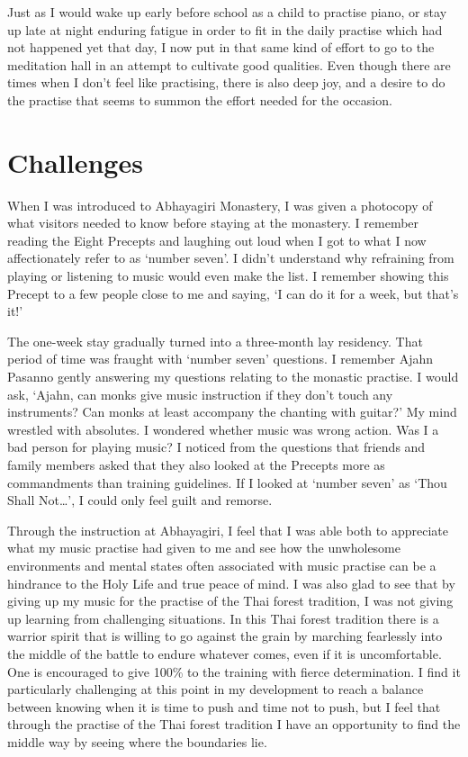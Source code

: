 Just as I would wake up early before school as a
child to practise piano, or stay up late at night enduring fatigue in
order to fit in the daily practise which had not happened yet that day, 
I now put in that same kind of effort to go to the meditation hall in an
attempt to cultivate good qualities. Even though there are times when I
don't feel like practising, there is also deep joy, and a desire to do
the practise that seems to summon the effort needed for the occasion. 

\section{Challenges}

When I was introduced to Abhayagiri Monastery, I was given a photocopy
of what visitors needed to know before staying at the monastery. I
remember reading the Eight Precepts and laughing out loud when I got to
what I now affectionately refer to as `number seven'. I didn't
understand why refraining from playing or listening to music would even
make the list. I remember showing this Precept to a few people close to
me and saying, `I can do it for a week, but that's it!'

The one-week stay gradually turned into a three-month lay residency. 
That period of time was fraught with `number seven' questions. I
remember Ajahn Pasanno gently answering my questions relating to the
monastic practise. I would ask, `Ajahn, can monks give music instruction
if they don't touch any instruments? Can monks at least accompany the
chanting with guitar?' My mind wrestled with absolutes. I wondered
whether music was wrong action. Was I a bad person for playing music? I
noticed from the questions that friends and family members asked that
they also looked at the Precepts more as commandments than training
guidelines. If I looked at `number seven' as `Thou Shall Not\ldots{}', I
could only feel guilt and remorse.

Through the instruction at
Abhayagiri, I feel that I was able both to appreciate what my music
practise had given to me and see how the unwholesome environments and
mental states often associated with music practise can be a hindrance to
the Holy Life and true peace of mind. I was also glad to see that by
giving up my music for the practise of the Thai forest tradition, I was
not giving up learning from challenging situations. In this Thai forest
tradition there is a warrior spirit that is willing to go against the
grain by marching fearlessly into the middle of the battle to endure
whatever comes, even if it is uncomfortable. One is encouraged to give
100\% to the training with fierce determination. I find it particularly
challenging at this point in my development to reach a balance between
knowing when it is time to push and time not to push, but I feel that
through the practise of the Thai forest tradition I have an opportunity
to find the middle way by seeing where the boundaries lie. 

